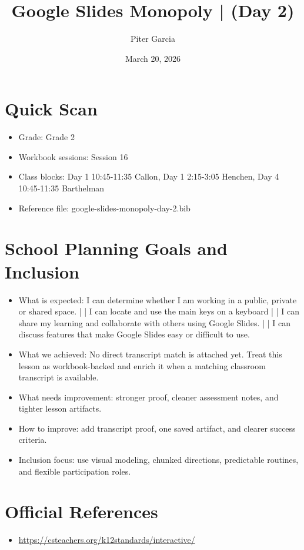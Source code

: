 \documentclass[11pt]{article}
\title{Google Slides Monopoly | (Day 2)}
\author{Piter Garcia}
\date{March 20, 2026}
\begin{document}
\maketitle
\section*{Quick Scan}
\begin{itemize}[leftmargin=*]
\item Grade: Grade 2
\item Workbook sessions: Session 16
\item Class blocks: Day 1 10:45-11:35 Callon, Day 1 2:15-3:05 Henchen, Day 4 10:45-11:35 Barthelman
\item Reference file: google-slides-monopoly-day-2.bib
\end{itemize}
\section*{School Planning Goals and Inclusion}
\begin{itemize}[leftmargin=*]
\item What is expected: I can determine whether I am working in a public, private or shared space. | | I can locate and use the main keys on a keyboard | | I can share my learning and collaborate with others using Google Slides. | | I can discuss features that make Google Slides easy or difficult to use.
\item What we achieved: No direct transcript match is attached yet. Treat this lesson as workbook-backed and enrich it when a matching classroom transcript is available.
\item What needs improvement: stronger proof, cleaner assessment notes, and tighter lesson artifacts.
\item How to improve: add transcript proof, one saved artifact, and clearer success criteria.
\item Inclusion focus: use visual modeling, chunked directions, predictable routines, and flexible participation roles.
\end{itemize}
\section*{Official References}
\begin{itemize}[leftmargin=*]
\item \url{https://csteachers.org/k12standards/interactive/}

\end{itemize}
\end{document}
